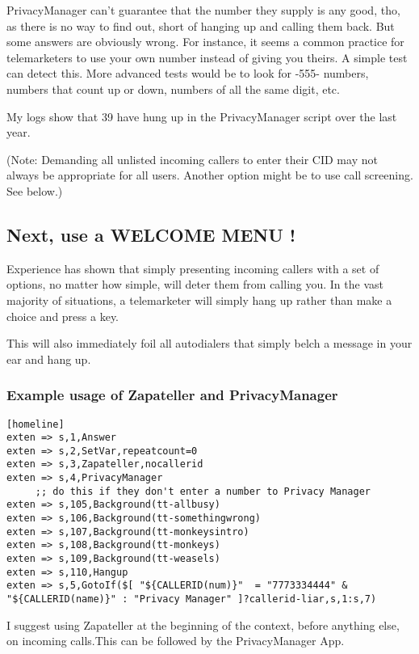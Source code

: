 PrivacyManager can't guarantee that the number they supply is any
good, tho, as there is no way to find out, short of hanging up and
calling them back. But some answers are obviously wrong. For instance,
it seems a common practice for telemarketers to use your own number
instead of giving you theirs. A simple test can detect this. More
advanced tests would be to look for -555- numbers, numbers that count
up or down, numbers of all the same digit, etc.

My logs show that 39 have hung up in the PrivacyManager script over
the last year.

(Note: Demanding all unlisted incoming callers to enter their CID may
not always be appropriate for all users. Another option might be to
use call screening. See below.)


\subsection{Next, use a WELCOME MENU !}

Experience has shown that simply presenting incoming callers with
a set of options, no matter how simple, will deter them from calling
you. In the vast majority of situations, a telemarketer will simply
hang up rather than make a choice and press a key.

This will also immediately foil all autodialers that simply belch a
message in your ear and hang up.

\subsubsection{Example usage of Zapateller and PrivacyManager}

\begin{astlisting}
\begin{verbatim}
[homeline]
exten => s,1,Answer
exten => s,2,SetVar,repeatcount=0
exten => s,3,Zapateller,nocallerid
exten => s,4,PrivacyManager
     ;; do this if they don't enter a number to Privacy Manager
exten => s,105,Background(tt-allbusy)
exten => s,106,Background(tt-somethingwrong)
exten => s,107,Background(tt-monkeysintro)
exten => s,108,Background(tt-monkeys)
exten => s,109,Background(tt-weasels)
exten => s,110,Hangup
exten => s,5,GotoIf($[ "${CALLERID(num)}"  = "7773334444" & "${CALLERID(name)}" : "Privacy Manager" ]?callerid-liar,s,1:s,7)
\end{verbatim}
\end{astlisting}

I suggest using Zapateller at the beginning of the context, before
anything else, on incoming calls.This can be followed by the
PrivacyManager App.

